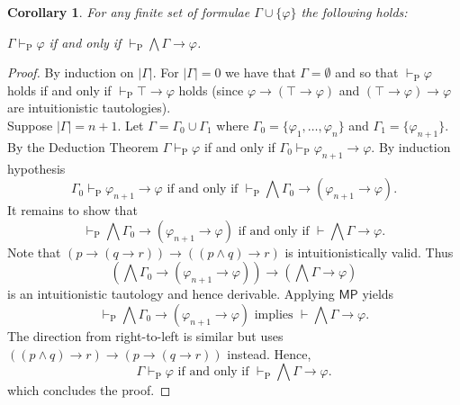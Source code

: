 \documentclass{myifcolog}
\newtheorem{corollary}[theorem]{Corollary}
\numberwithin{theorem}{section}
\begin{document}
\begin{corollary}\label{c: deduction theorem}
    For any finite set of formulae $\Gamma \cup \{\varphi\}$ the following holds:
    \begin{center}
        $\Gamma \vdash_\mathrm{P} \varphi$ if and only if $\vdash_\mathrm{P} \bigwedge \Gamma \rightarrow \varphi$.
    \end{center}
\end{corollary}
\begin{proof}
    By induction on $\lvert \Gamma \rvert$. For $\lvert \Gamma \rvert = 0$ we have that $\Gamma = \emptyset$ and so that $\vdash_\mathrm{P} \varphi$ holds if and only if $\vdash_\mathrm{P} \top \rightarrow \varphi$ holds (since $\varphi \rightarrow (\top \rightarrow \varphi)$ and $(\top \to \varphi) \to \varphi$ are intuitionistic tautologies). \smallskip \\
    Suppose $\lvert \Gamma \rvert = n+1$. Let $\Gamma =  \Gamma_0 \cup \Gamma_1$ where $\Gamma_0 = \{ \varphi_1, \ldots, \varphi_n \}$ and $\Gamma_1 = \{\varphi_{n+1}\}$. By the Deduction Theorem $\Gamma \vdash_\mathrm{P} \varphi$ if and only if $\Gamma_0 \vdash_\mathrm{P} \varphi_{n+1} \rightarrow \varphi$. By induction hypothesis
    \begin{equation*}
        \Gamma_0 \vdash_\mathrm{P} \varphi_{n+1} \rightarrow \varphi \text{ if and only if } \vdash_\mathrm{P} \bigwedge \Gamma_0 \rightarrow (\varphi_{n+1} \rightarrow \varphi).
    \end{equation*}
    It remains to show that
    \begin{equation*}\label{e: c: deduction theorem}
        \vdash_\mathrm{P} \bigwedge \Gamma_0 \rightarrow (\varphi_{n+1} \rightarrow \varphi) \text{ if and only if } \vdash \bigwedge \Gamma \rightarrow \varphi.
    \end{equation*}
   Note that $(p \rightarrow (q \rightarrow r)) \rightarrow((p \wedge q) \rightarrow r)$ is intuitionistically valid. Thus
    \begin{equation*}
         (\bigwedge \Gamma_0 \rightarrow (\varphi_{n+1} \rightarrow \varphi)) \rightarrow (\bigwedge \Gamma \rightarrow \varphi)
    \end{equation*}
    is an intuitionistic tautology and hence derivable. Applying $\mathsf{MP}$ yields
    \begin{equation*}
        \vdash_\mathrm{P}  \bigwedge \Gamma_0 \rightarrow (\varphi_{n+1} \rightarrow \varphi) \text{ implies }  \vdash \bigwedge \Gamma \rightarrow \varphi.
    \end{equation*}
    The direction from right-to-left is similar but uses $((p \wedge q) \rightarrow r) \rightarrow (p \rightarrow (q \rightarrow r))$ instead.  Hence,
    \begin{equation*}
        \Gamma \vdash_\mathrm{P} \varphi \text{ if and only if } \vdash_\mathrm{P} \bigwedge \Gamma \rightarrow \varphi.
    \end{equation*}
    which concludes the proof.
\end{proof}
\end{document}
